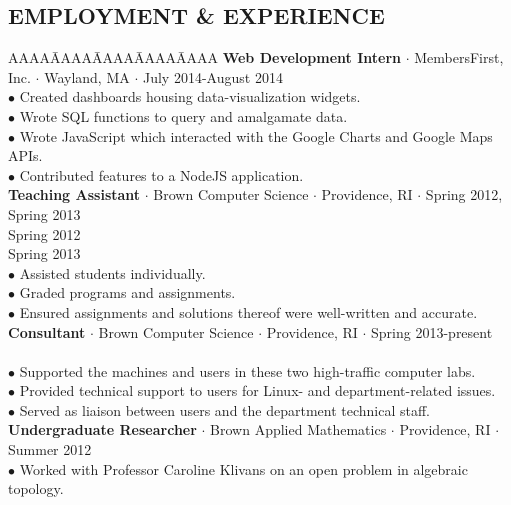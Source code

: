 \documentclass{res}
\begin{document}
\begin{resume}
\section{EMPLOYMENT \& EXPERIENCE}
   \myvspace
   \begin{tabbing}
   AAAA\=AAAA\=AAAA\=AAAA\=AAAA\kill
 {\bf Web Development Intern} $\cdot$ MembersFirst, Inc. $\cdot$ Wayland, MA $\cdot$ July 2014-August 2014\\
	\>$\bullet$ Created dashboards housing data-visualization widgets.\\
	\>$\bullet$ Wrote SQL functions to query and amalgamate data.\\
	\>$\bullet$ Wrote JavaScript which interacted with the Google Charts and Google Maps APIs.\\
	\>$\bullet$ Contributed features to a NodeJS application.\\
 \sbreak
 {\bf Teaching Assistant} $\cdot$ Brown Computer Science $\cdot$ Providence, RI $\cdot$ Spring 2012, Spring 2013\\
	\>Spring 2012 \\
	\>Spring 2013 \\
	\>$\bullet$  Assisted students individually.\\
	\>$\bullet$  Graded programs and assignments.\\
	\>$\bullet$  Ensured assignments and solutions thereof were well-written and accurate.\\
\sbreak
{\bf Consultant} $\cdot$ Brown Computer Science $\cdot$ Providence, RI $\cdot$ Spring 2013-present\\
	\\
	\>$\bullet$ Supported the machines and users in these two high-traffic computer labs.\\
	\>$\bullet$ Provided technical support to users for Linux- and department-related issues.\\
	\>$\bullet$ Served as  liaison between users and the department technical staff.\\
\sbreak
{\bf Undergraduate Researcher} $\cdot$ Brown Applied Mathematics $\cdot$ Providence, RI $\cdot$ Summer 2012\\
\>$\bullet$ Worked with Professor Caroline Klivans on an open problem in algebraic topology.\\


\end{tabbing}
\end{resume}
\end{document}
